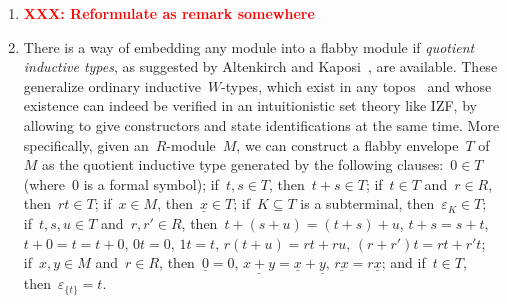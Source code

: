\documentclass[oneside]{amsart}
\theoremstyle{definition}
\theoremstyle{plain}
\theoremstyle{remark}
\newcommand{\XXX}[1]{\textbf{\textcolor{red}{XXX: #1}}}
\renewcommand{\_}{\mathpunct{.}\,}
\begin{document}
\begin{enumerate}
\item \XXX{Reformulate as remark somewhere}


\item There is a way of embedding any module into a flabby module if
\emph{quotient inductive types}, as suggested by Altenkirch and
Kaposi~\cite{altenkirch-kaposi:qits}, are available. These generalize ordinary
inductive~$W$-types, which exist in any
topos~\cite{moerdijk-palmgren:wellfounded-trees,berg-moerdijk:w-types-in-sheaves,berg-kouwenhoven-gentil:w-types-in-eff}
and whose existence
can indeed be verified in an intuitionistic set theory like IZF, by allowing to
give constructors and state identifications at the same time. More
specifically, given an~$R$-module~$M$, we can construct a flabby envelope~$T$
of~$M$ as the quotient inductive type generated by the following clauses:~$0
\in T$ (where~$0$ is a formal symbol); if~$t,s \in T$, then~$t + s \in T$;
if~$t \in T$ and~$r \in R$, then~$rt \in T$; if~$x \in M$, then~$\underline{x}
\in T$; if~$K \subseteq T$ is a subterminal, then~$\varepsilon_K \in T$;
if~$t,s,u \in T$ and~$r,r' \in R$, then~$t + (s + u) = (t + s) + u$, $t + s = s + t$, $t + 0 = t
= t + 0$, $0t = 0$, $1t = t$, $r(t+u) = rt + ru$, $(r+r')t = rt + r't$; if~$x,y
\in M$ and~$r \in R$, then~$\underline{0} = 0$, $\underline{x + y} =
\underline{x} + \underline{y}$, $\underline{rx} = r \underline{x}$; and if~$t
\in T$, then~$\varepsilon_{\{t\}} = t$.


\end{enumerate}
\end{document}
